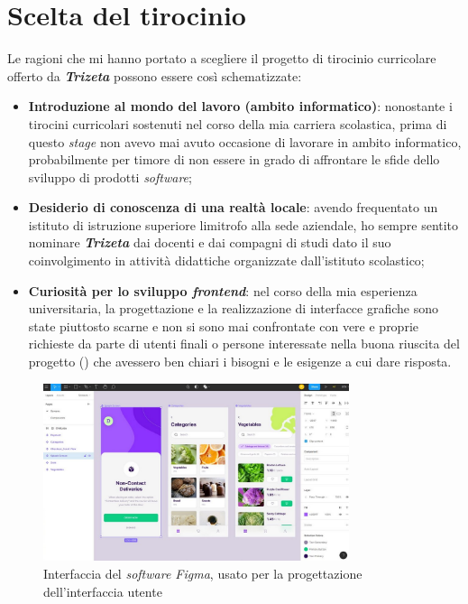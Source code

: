 \section{Scelta del tirocinio}
Le ragioni che mi hanno portato a scegliere il progetto di tirocinio curricolare offerto da \textit{\textbf{Trizeta}} possono essere così schematizzate:
\begin{itemize}
    \item \textbf{Introduzione al mondo del lavoro (ambito informatico)}: nonostante i tirocini curricolari sostenuti nel corso della mia carriera scolastica, prima di questo \textit{stage} non avevo mai avuto occasione di lavorare in ambito informatico, 
            probabilmente per timore di non essere in grado di affrontare le sfide dello sviluppo di prodotti \textit{software};
    \item \textbf{Desiderio di conoscenza di una realtà locale}: avendo frequentato un istituto di istruzione superiore limitrofo alla sede aziendale, ho sempre sentito nominare \textit{\textbf{Trizeta}} dai docenti e dai compagni di studi dato il suo 
        coinvolgimento in attività didattiche organizzate dall'istituto scolastico;
    \item \textbf{Curiosità per lo sviluppo \textit{frontend}}: nel corso della mia esperienza universitaria, la progettazione e la realizzazione di interfacce grafiche sono state piuttosto scarne e non si sono mai confrontate con vere e proprie
        richieste da parte di utenti finali o persone interessate nella buona riuscita del progetto () che avessero ben chiari i bisogni e le esigenze a cui dare risposta.
\end{itemize}

\begin{figure}[H]
    \centering
    \includegraphics[width=0.8\textwidth]{images/figma-editor.jpg}
    \caption[Interfaccia del \textit{software Figma}]{Interfaccia del \textit{software Figma}, usato per la progettazione dell'interfaccia utente\footnotemark}
\end{figure}

